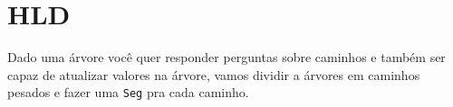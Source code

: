    
    \section{HLD}
    Dado uma árvore você quer responder perguntas sobre caminhos e também ser capaz de atualizar valores na árvore, vamos dividir a árvores em caminhos pesados e fazer uma \texttt{Seg} pra cada caminho.
    
